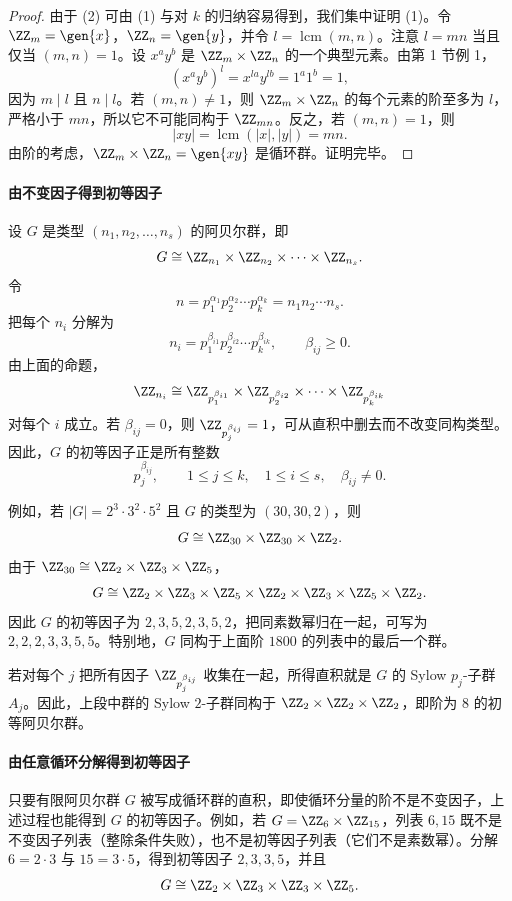 \begin{proof}
由于 (2) 可由 (1) 与对 $k$ 的归纳容易得到，我们集中证明 (1)。令 $\ZZ_m=\gen{x}$，$\ZZ_n=\gen{y}$，并令 $l=\operatorname{lcm}(m,n)$。注意 $l=mn$ 当且仅当 $(m,n)=1$。设 $x^ay^b$ 是 $\ZZ_m\times\ZZ_n$ 的一个典型元素。由第 1 节例 1，
\[
  (x^ay^b)^l=x^{la}y^{lb}=1^a1^b=1,
\]
因为 $m\mid l$ 且 $n\mid l$。若 $(m,n)\neq1$，则 $\ZZ_m\times\ZZ_n$ 的每个元素的阶至多为 $l$，严格小于 $mn$，所以它不可能同构于 $\ZZ_{mn}$。反之，若 $(m,n)=1$，则
\[
  |xy|=\operatorname{lcm}(|x|,|y|)=mn.
\]
由阶的考虑，$\ZZ_m\times\ZZ_n=\gen{xy}$ 是循环群。证明完毕。
\end{proof}

\paragraph{由不变因子得到初等因子}
设 $G$ 是类型 $(n_1,n_2,
\ldots,n_s)$ 的阿贝尔群，即
\[
  G\cong \ZZ_{n_1}\times\ZZ_{n_2}\times\cdots\times\ZZ_{n_s}.
\]
令
\[
  n=p_1^{\alpha_1}p_2^{\alpha_2}\cdots p_k^{\alpha_k}=n_1n_2\cdots n_s.
\]
把每个 $n_i$ 分解为
\[
  n_i=p_1^{\beta_{i1}}p_2^{\beta_{i2}}\cdots p_k^{\beta_{ik}},
  \qquad \beta_{ij}\geq0.
\]
由上面的命题，
\[
  \ZZ_{n_i}\cong \ZZ_{p_1^{\beta_{i1}}}\times\ZZ_{p_2^{\beta_{i2}}}\times\cdots\times\ZZ_{p_k^{\beta_{ik}}}
\]
对每个 $i$ 成立。若 $\beta_{ij}=0$，则 $\ZZ_{p_j^{\beta_{ij}}}=1$，可从直积中删去而不改变同构类型。因此，$G$ 的初等因子正是所有整数
\[
  p_j^{\beta_{ij}},\qquad 1\leq j\leq k,
\quad 1\leq i\leq s,
\quad \beta_{ij}\neq0.
\]

例如，若 $|G|=2^3\cdot3^2\cdot5^2$ 且 $G$ 的类型为 $(30,30,2)$，则
\[
  G\cong \ZZ_{30}\times\ZZ_{30}\times\ZZ_2.
\]
由于 $\ZZ_{30}\cong \ZZ_2\times\ZZ_3\times\ZZ_5$，
\[
  G\cong \ZZ_2\times\ZZ_3\times\ZZ_5\times\ZZ_2\times\ZZ_3\times\ZZ_5\times\ZZ_2.
\]
因此 $G$ 的初等因子为 $2,3,5,2,3,5,2$，把同素数幂归在一起，可写为 $2,2,2,3,3,5,5$。特别地，$G$ 同构于上面阶 $1800$ 的列表中的最后一个群。

若对每个 $j$ 把所有因子 $\ZZ_{p_j^{\beta_{ij}}}$ 收集在一起，所得直积就是 $G$ 的 Sylow $p_j$-子群 $A_j$。因此，上段中群的 Sylow $2$-子群同构于 $\ZZ_2\times\ZZ_2\times\ZZ_2$，即阶为 $8$ 的初等阿贝尔群。

\paragraph{由任意循环分解得到初等因子}
只要有限阿贝尔群 $G$ 被写成循环群的直积，即使循环分量的阶不是不变因子，上述过程也能得到 $G$ 的初等因子。例如，若 $G=\ZZ_6\times\ZZ_{15}$，列表 $6,15$ 既不是不变因子列表（整除条件失败），也不是初等因子列表（它们不是素数幂）。分解 $6=2\cdot3$ 与 $15=3\cdot5$，得到初等因子 $2,3,3,5$，并且
\[
  G\cong \ZZ_2\times\ZZ_3\times\ZZ_3\times\ZZ_5.
\]

